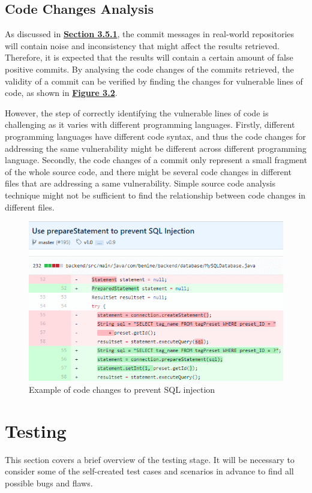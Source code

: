 \documentclass[12pt, a4paper]{report}
\begin{document}
\subsection{Code Changes Analysis}
As discussed in \hyperref[subsec:commit_quality]{\textbf{Section 3.5.1}}, the commit messages in
real-world repositories will contain noise and inconsistency that might affect the results
retrieved. Therefore, it is expected that the results will contain a certain amount of false
positive commits. By analysing the code changes of the commits retrieved, the validity of a commit
can be verified by finding the changes for vulnerable lines of code, as shown in
\hyperref[figure:code_diff]{\textbf{Figure 3.2}}.

However, the step of correctly identifying the vulnerable lines of code is challenging as it varies
with different programming languages. Firstly, different programming languages have different code
syntax, and thus the code changes for addressing the same vulnerability might be different across
different programming language. Secondly, the code changes of a commit only represent a small
fragment of the whole source code, and there might be several code changes in different files that
are addressing a same vulnerability. Simple source code analysis technique might not be sufficient
to find the relationship between code changes in different files.

\begin{figure}[H]
  \centering
  \includegraphics[width=.85\linewidth]{images/code_diff.png}
  \caption{Example of code changes to prevent SQL injection \cite{code_diff}}
  \label{figure:code_diff}
\end{figure}

\section{Testing}
This section covers a brief overview of the testing stage. It will be necessary to consider some of
the self-created test cases and scenarios in advance to find all possible bugs and flaws.
\end{document}
